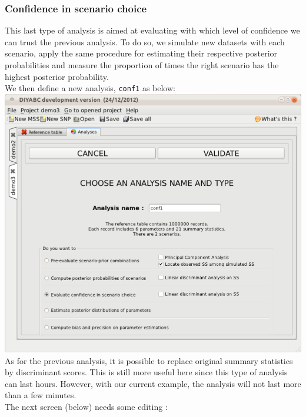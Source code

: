 \subsubsection{Confidence in scenario choice}

This last type of analysis is aimed at evaluating with which level of confidence we can trust the previous analysis. To do so, we simulate new datasets with each scenario, apply the same procedure for estimating their respective posterior probabilities and measure the proportion of times the right scenario has the highest posterior probability.\\
We then define a new analysis, \texttt{conf1} as below:\\   

\includegraphics[scale=0.33]{gui_pictures/Capture-DIYABC-115.png} \\

As for the previous analysis, it is possible to replace original summary statistics by discriminant scores. This is still more useful here since this type of analysis can last hours. However, with our current example, the analysis will not last more than a few minutes.\\
The next screen (below) needs some editing :\\

